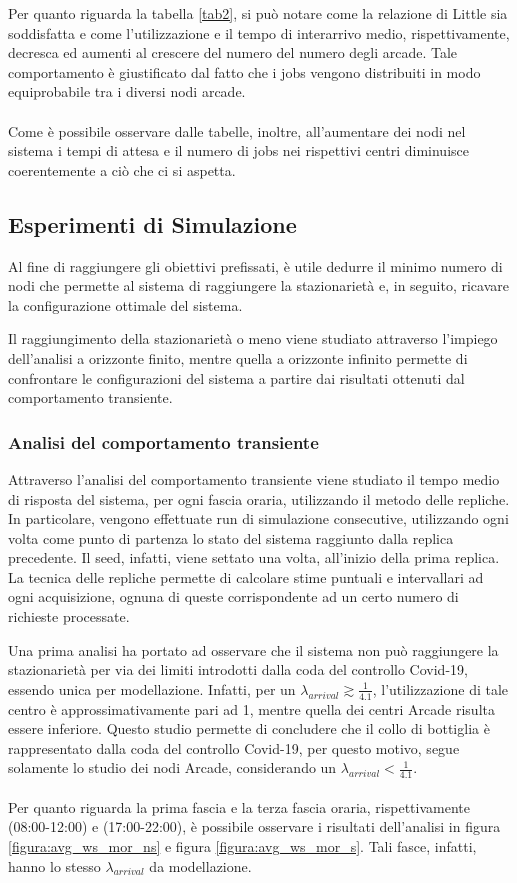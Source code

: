 \documentclass{article}
\begin{document}
Per quanto riguarda la tabella \ref{tab2}, si può notare come la relazione di Little sia soddisfatta e come l'utilizzazione e il tempo di interarrivo medio, rispettivamente, decresca ed aumenti al crescere del numero del numero degli arcade. Tale comportamento è giustificato dal fatto che i jobs vengono distribuiti in modo equiprobabile tra i diversi nodi arcade.
\\ \\
Come è possibile osservare dalle tabelle, inoltre, all'aumentare dei nodi nel sistema i tempi di attesa e il numero di jobs nei rispettivi centri diminuisce coerentemente a ciò che ci si aspetta.

\subsection{Esperimenti di Simulazione}
Al fine di raggiungere gli obiettivi prefissati, è utile dedurre il minimo numero di nodi che permette al sistema di raggiungere la stazionarietà e, in seguito, ricavare la configurazione ottimale del sistema.

Il raggiungimento della stazionarietà o meno viene studiato attraverso l'impiego dell'analisi a orizzonte finito, mentre quella a orizzonte infinito permette di confrontare le configurazioni del sistema a partire dai risultati ottenuti dal comportamento transiente. 
\subsubsection{Analisi del comportamento transiente}
Attraverso l'analisi del comportamento transiente viene studiato il tempo medio di risposta del sistema, per ogni fascia oraria, utilizzando il metodo delle repliche.
In particolare, vengono effettuate run di simulazione
consecutive, utilizzando ogni volta come punto di partenza lo stato del sistema raggiunto dalla replica precedente. Il seed, infatti, viene settato una volta, all'inizio della prima replica.
La tecnica delle repliche permette di calcolare stime puntuali e intervallari ad ogni acquisizione, ognuna di queste corrispondente ad un certo numero di richieste processate.

Una prima analisi ha portato ad osservare che il sistema non può raggiungere la stazionarietà per via dei limiti introdotti dalla coda del controllo Covid-19, essendo unica per modellazione. Infatti, per un $\lambda_{arrival} \gtrsim \frac{1}{4.1}$, l'utilizzazione di tale centro è approssimativamente pari ad 1, mentre quella dei centri Arcade risulta essere inferiore. Questo studio permette di concludere che il collo di bottiglia è rappresentato dalla coda del controllo Covid-19, per questo motivo, segue solamente lo studio dei nodi Arcade, considerando un $\lambda_{arrival} < \frac{1}{4.1}$.
\\ \\
Per quanto riguarda la prima fascia e la terza fascia oraria, rispettivamente (08:00-12:00) e (17:00-22:00), è possibile osservare i risultati dell'analisi in figura \ref{figura:avg_ws_mor_ns} e figura \ref{figura:avg_ws_mor_s}. Tali fasce, infatti, hanno lo stesso $\lambda_{arrival}$ da modellazione.
\end{document}
